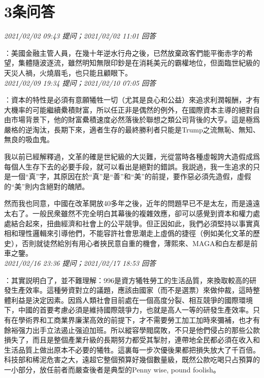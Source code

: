 \documentclass[twocolumn]{ctexart}
\begin{document}
\section{3条问答}

\textit{\hfill\noindent\small 2021/02/02 09:43 提问；2021/02/02 11:01 回答}

：美國金融主管人員，在幾十年逆水行舟之後，已然放棄政客們能平衡赤字的希望，集體隨波逐流，雖然明知無限印鈔是在消耗美元的霸權地位，但面臨世紀級的天災人禍，火燒眉毛，也只能且顧眼下。
\\

\textit{\hfill\noindent\small 2021/02/09 19:34 提问；2021/02/10 07:05 回答}

：資本的特性是必須有意願犧牲一切（尤其是良心和公益）來追求利潤報酬，才有大機率的可能繼續纍積財富，所以任正非是偶然的例外，在國際資本主導的絕對自由市場背景下，他的財富纍積速度必然落後於聯想之類公司背後的大亨。這是極爲嚴格的逆淘汰，長期下來，適者生存的最終勝利者只能是Trump之流無恥、無知、無良的吸血鬼。

我以前已經解釋過，文革的確是世紀級的大災難，光從當時各種虛報誇大造假成爲每個人生存下去的必要手段，就可以看出是絕對的錯誤。我説過，我一生追求的只是一個“真”字，其原因在於“真”是“善”和“美”的前提，要作惡必須先造假，虛假的“美”則内含絕對的醜陋。

然而我也同意，中國在改革開放40多年之後，近年的問題早已不是太左，而是遠遠太右了。一般民衆雖然不完全明白其幕後的複雜效應，卻可以感覺到資本和權力處處結合起來，扭曲經濟和社會上的公平競爭。但正因如此，我們必須堅持以事實真相和理性邏輯來引導他們，不能容許社會思潮走上虛僞的捷徑（例如美化文革的歷史），否則就徒然給別有用心者挾民意自重的機會，薄熙來、MAGA和白左都是前車之鑒。
\\

\textit{\hfill\noindent\small 2021/02/16 23:36 提问；2021/02/17 18:53 回答}

：其實説明白了，並不難理解：996是資方犧牲勞工的生活品質，來換取較高的研發生產效率。這種勞資對立的議題，應該由國家（而不是選票）來做仲裁，這時整體利益是決定因素。因爲人類社會目前處在一個高度分裂、相互競爭的國際環境下，中國的首要考慮必須是維持國際競爭力，也就是高人一等的研發生產效率。只有在學術界和工商業界廉潔高效的前提下，才不需要勞工加工加時來彌補，也才有餘裕强力出手立法遏止强迫加班。所以縱容學閥腐敗，不只是他們侵占的那些公款損失了，而且是整個產業升級的長期努力都受其掣肘，連帶地全民都必須在收入和生活品質上做出原本不必要的犧牲。這裏每一步次優後果都把損失放大了千百倍。科技部和稀泥危害之大，遠超它整個預算好幾個數量級，既然公款吃喝只占預算的一小部分，放任前者而嚴查後者是典型的Penny wise, pound foolish。
\end{document}
